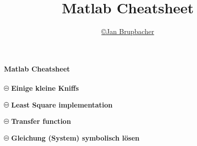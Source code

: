 % 
%

\newcommand{\Author}{\copyright Jan Brupbacher}
\newcommand{\Title}{Matlab Cheatsheet}

\author{\href{mailto:jan.brupbacher@hsr.ch}{\Author}}
\title{\Title}




\usepackage{bold-extra}


	\textbf{\Huge\Title}\\
	\vspace*{-0.1cm}\\
	\lstset{style=Matlab}
	\includegraphics[width=0.02\textwidth]{pics/coding.png} \textbf{\Large Einige kleine Kniffs}
	
	\includegraphics[width=0.02\textwidth]{pics/coding.png} \textbf{\Large Least Square implementation}
	
	\includegraphics[width=0.02\textwidth]{pics/coding.png} \textbf{\Large Transfer function}
	
	\includegraphics[width=0.02\textwidth]{pics/coding.png} \textbf{\Large Gleichung (System) symbolisch l\"osen}
	
